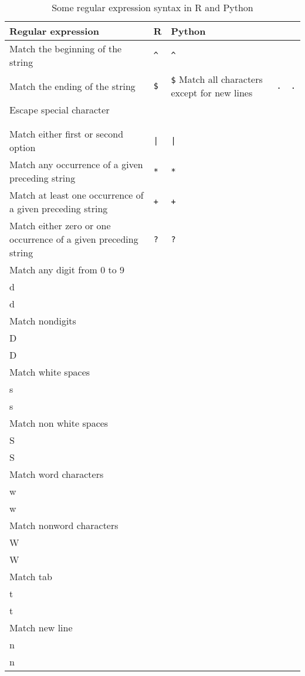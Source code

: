 \begin{table}
  \caption{\label{tab:regex}Some regular expression syntax in R and Python}{
  \begin{tabularx}{\textwidth}{lllll}
    \toprule
Regular expression      & R   & Python\\ \midrule
Match the beginning of the string	& \texttt{^} & \texttt{^}  \\
Match the ending	 of the string   & \texttt{\$} & \texttt{\$} 
Match all characters except for new lines   & \texttt{.} & \texttt{.} 	\\ 
Escape special character  & \texttt{\\} & \texttt{\\}     \\ 
Match either first or second option  & \texttt{|} & \texttt{|}    \\ 
Match any occurrence of a given preceding string & \texttt{*} & \texttt{*} \\ 
Match at least one occurrence of a given preceding string & \texttt{+} & \texttt{+} \\ 
Match either zero or one occurrence of a given preceding string & \texttt{?} & \texttt{?} \\ 
Match any digit from 0 to 9	& \texttt{\\d} & \texttt{\\d}  \\
Match nondigits	& \texttt{\\D} & \texttt{\\D}  \\
Match white spaces	& \texttt{\\s} & \texttt{\\s}	+  \\
Match non white spaces	& \texttt{\\S} & \texttt{\\S}	+  \\
Match word characters	 & \texttt{\\w} & \texttt{\\w}  \\
Match nonword characters	& \texttt{\\W} & \texttt{\\W}  \\
Match tab	& \texttt{\\t} & \texttt{\\t}	+  \\
Match new line	& \texttt{\\n} & \texttt{\\n}		+  \\
    \bottomrule
  \end{tabularx}}{}
\end{table}



